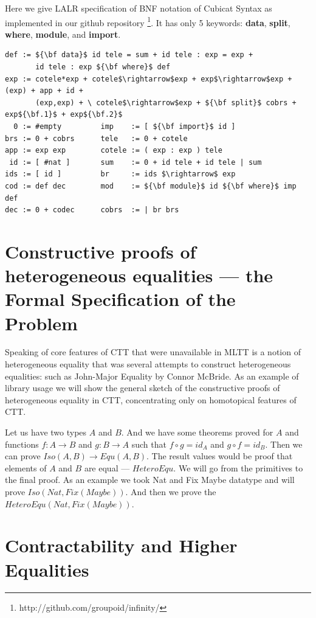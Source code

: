 \documentclass{svproc}
\begin{document}
Here we give LALR specification of BNF notation of Cubicat Syntax as implemented
in our github repository \footnote{http://github.com/groupoid/infinity/}. It has
only 5 keywords: {\bf data}, {\bf split}, {\bf where}, {\bf module}, and {\bf import}.

\begin{lstlisting}[mathescape=true]
def := ${\bf data}$ id tele = sum + id tele : exp = exp +
       id tele : exp ${\bf where}$ def
exp := cotele*exp + cotele$\rightarrow$exp + exp$\rightarrow$exp + (exp) + app + id +
       (exp,exp) + \ cotele$\rightarrow$exp + ${\bf split}$ cobrs + exp${\bf.1}$ + exp${\bf.2}$
  0 := #empty         imp    := [ ${\bf import}$ id ]
brs := 0 + cobrs      tele   := 0 + cotele
app := exp exp        cotele := ( exp : exp ) tele
 id := [ #nat ]       sum    := 0 + id tele + id tele | sum
ids := [ id ]         br     := ids $\rightarrow$ exp
cod := def dec        mod    := ${\bf module}$ id ${\bf where}$ imp def
dec := 0 + codec      cobrs  := | br brs
\end{lstlisting}

\section{Constructive proofs of heterogeneous equalities --- the Formal Specification of the Problem}

Speaking of core features of CTT that were unavailable in MLTT is a notion
of heterogeneous equality that was several attempts to construct heterogeneous equalities:
such as John-Major Equality by Connor McBride. As an example of library usage
we will show the general sketch of the constructive proofs of heterogeneous equality in CTT,
concentrating only on homotopical features of CTT.

Let us have two types $A$ and $B$. And we have some theorems proved for $A$ and functions
$f: A \rightarrow B$ and $g: B \rightarrow A$ such that $f \circ g = id_A$ and $g \circ f = id_B$. Then we
can prove $Iso(A,B) \rightarrow Equ(A,B)$. The result values would be proof that
elements of $A$ and $B$ are equal --- $HeteroEqu$. We will go from the primitives to the final proof.
As an example we took Nat and Fix Maybe datatype and will prove $Iso(Nat,Fix(Maybe))$.
And then we prove the $HeteroEqu(Nat,Fix(Maybe))$.

\section{Contractability and Higher Equalities}
\end{document}
